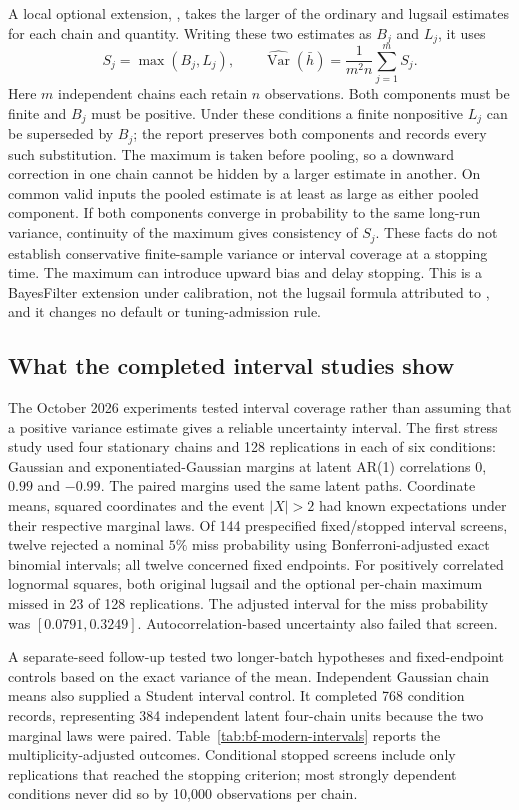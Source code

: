 A local optional extension, , takes the larger
of the ordinary and lugsail estimates for each chain and quantity. Writing
these two estimates as $B_j$ and $L_j$, it uses
\[
 S_j=\max(B_j,L_j),\qquad
 \widehat{\operatorname{Var}}(\bar h)=\frac{1}{m^2 n}\sum_{j=1}^{m}S_j.
\]
Here $m$ independent chains each retain $n$ observations. Both components
must be finite and $B_j$ must be positive. Under these
conditions a finite nonpositive $L_j$ can be superseded by $B_j$; the report
preserves both components and records every such substitution. The maximum
is taken before pooling, so a downward correction in one chain cannot be
hidden by a larger estimate in another. On common valid inputs the pooled
estimate is at least as large as either pooled component. If both components
converge in probability to the same long-run variance, continuity of the
maximum gives consistency of $S_j$. These facts do not establish conservative
finite-sample variance or interval coverage at a stopping time. The maximum
can introduce upward bias and delay stopping. This is a BayesFilter extension
under calibration, not the lugsail formula attributed to
\citet{vats2021lugsail}, and it changes no default or tuning-admission rule.

\subsection{What the completed interval studies show}

The October 2026 experiments tested interval coverage rather than assuming
that a positive variance estimate gives a reliable uncertainty interval. The
first stress study used four stationary chains and 128 replications in each
of six conditions: Gaussian and exponentiated-Gaussian margins at latent
AR(1) correlations $0$, $0.99$ and $-0.99$. The paired margins used the same
latent paths. Coordinate means, squared coordinates and the event
$|X|>2$ had known expectations under their respective marginal laws.
Of 144 prespecified fixed/stopped interval screens, twelve rejected a nominal
$5\%$ miss probability using Bonferroni-adjusted exact binomial intervals;
all twelve concerned fixed endpoints. For positively correlated lognormal
squares, both original lugsail and the optional per-chain maximum missed in
23 of 128 replications. The adjusted interval for the miss probability was
$[0.0791,0.3249]$. Autocorrelation-based uncertainty also failed that screen.

A separate-seed follow-up tested two longer-batch hypotheses and
fixed-endpoint controls based on the exact variance of the mean. Independent
Gaussian chain means also supplied a Student interval control. It completed
768 condition records, representing 384 independent latent four-chain units
because the two marginal laws were paired. Table~\ref{tab:bf-modern-intervals}
reports the multiplicity-adjusted outcomes. Conditional stopped screens
include only replications that reached the stopping criterion; most strongly
dependent conditions never did so by 10,000 observations per chain.

